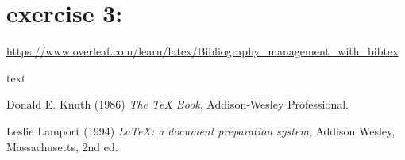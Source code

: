 \section{exercise 3:}
\url{https://www.overleaf.com/learn/latex/Bibliography_management_with_bibtex}

text \cite{texbook}
\\
\begin{thebibliography}{99}
	Donald E. Knuth (1986) \emph{The \TeX{} Book}, Addison-Wesley Professional.

	Leslie Lamport (1994) \emph{\LaTeX: a document preparation system}, Addison Wesley, Massachusetts, 2nd ed.
\end{thebibliography}

